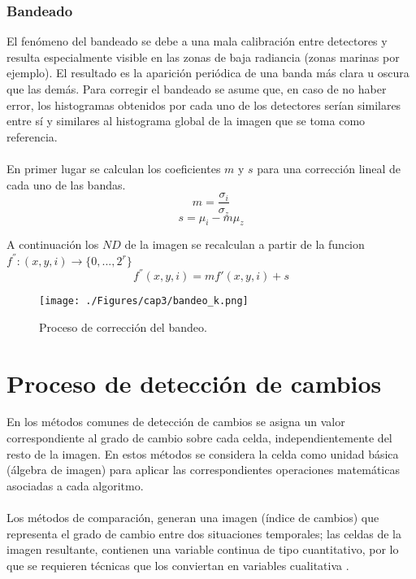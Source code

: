 \subsubsection{Bandeado}\label{subsec:bandeado}
El fen\'omeno del bandeado se debe a una mala calibraci\'on entre detectores y resulta especialmente visible en las zonas de baja radiancia (zonas marinas por ejemplo). El resultado es la aparici\'on peri\'odica de una banda m\'as clara u oscura que las dem\'as.
Para corregir el bandeado se asume que, en caso de no haber error, los histogramas obtenidos por cada uno de los detectores ser\'ian similares entre s\'i y similares al histograma global de la imagen que se toma como referencia.\\~\\
En primer lugar se calculan los coeficientes $ m $ y $ s $ para una correcci\'on lineal de cada uno de las bandas.
		\begin{equation}
		m =\dfrac{\sigma_{i}}{\sigma_{z}}
		\end{equation} 	
				\begin{equation}
				s=\mu_{i} - m\mu_{z}
				\end{equation} 	
				

A continuaci\'on los $ ND $ de la imagen se recalculan a partir de la funcion $ f^{''}:(x,y,i) \longrightarrow \{0,...,2^{r}\} $
				\begin{equation}
				f^{''}(x,y,i) = m f'(x,y,i) + s
				\end{equation} 				

    \begin{figure}[H]
    	\centering
    	\texttt{[image: ./Figures/cap3/bandeo\_k.png]}
    	\caption{Proceso de correcci\'on del bandeo.}
    	\label{fig:bandeado}
    \end{figure}

\section{Proceso de detecci\'on de cambios}
En los m\'etodos comunes de detecci\'on de cambios se asigna un valor correspondiente al grado de cambio sobre cada celda, independientemente del resto de la imagen. En estos m\'etodos se considera la celda como unidad b\'asica (\'algebra de imagen) para aplicar las correspondientes operaciones matem\'aticas asociadas a cada algoritmo.\\~\\
Los m\'etodos de comparaci\'on, generan una imagen (\'indice de cambios) que representa el grado de cambio entre dos situaciones temporales; las celdas de la imagen resultante, contienen una variable continua de tipo cuantitativo, por lo que se requieren t\'ecnicas que los conviertan en variables cualitativa \cite{martinez2013normalizacion}.
